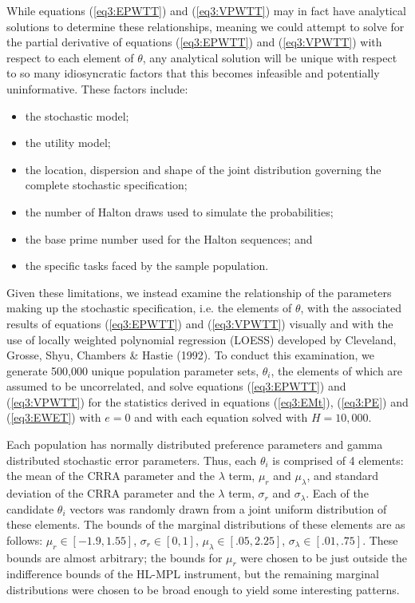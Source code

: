 \documentclass[../main.tex]{subfiles}
\begin{document}
While equations (\ref{eq3:EPWTT}) and (\ref{eq3:VPWTT}) may in fact have analytical solutions to determine these relationships, meaning we could attempt to solve for the partial derivative of equations (\ref{eq3:EPWTT}) and (\ref{eq3:VPWTT}) with respect to each element of $\theta$, any analytical solution will be unique with respect to so many idiosyncratic factors that this becomes infeasible and potentially uninformative.
These factors include:
\begin{itemize}
 \setlength\itemsep{-.25em}
	\item the stochastic model;
	\item the utility model;
	\item the location, dispersion and shape of the joint distribution governing the complete stochastic specification;
	\item the number of Halton draws used to simulate the probabilities;
	\item the base prime number used for the Halton sequences; and
	\item the specific tasks faced by the sample population.
\end{itemize}

\noindent Given these limitations, we instead examine the relationship of the parameters making up the stochastic specification, i.e. the elements of $\theta$, with the associated results of equations (\ref{eq3:EPWTT}) and (\ref{eq3:VPWTT}) visually and with the use of locally weighted polynomial regression (LOESS) developed by Cleveland, Grosse, Shyu, Chambers \& Hastie (1992).
To conduct this examination, we generate 500,000 unique population parameter sets, $\theta_i$, the elements of which are assumed to be uncorrelated, and solve equations (\ref{eq3:EPWTT}) and (\ref{eq3:VPWTT}) for the statistics derived in equations (\ref{eq3:EMt}), (\ref{eq3:PE}) and (\ref{eq3:EWET}) with $e=0$ and with each equation solved with $H=10,000$.

Each population has normally distributed preference parameters and gamma distributed stochastic error parameters.
Thus, each $\theta_i$ is comprised of 4 elements: the mean of the CRRA parameter and the $\lambda$ term, $\mu_r$ and $\mu_\lambda$, and standard deviation of the CRRA parameter and the $\lambda$ term, $\sigma_r$ and $\sigma_\lambda$. Each of the candidate $\theta_i$ vectors was randomly drawn from a joint uniform distribution of these elements.
The bounds of the marginal distributions of these elements are as follows: $\mu_r \in [-1.9 , 1.55 ]$, $\sigma_r \in [0 , 1]$, $\mu_\lambda \in [.05 , 2.25]$, $\sigma_\lambda \in [.01 , .75]$.
These bounds are almost arbitrary; the bounds for $\mu_r$ were chosen to be just outside the indifference bounds of the HL-MPL instrument, but the remaining marginal distributions were chosen to be broad enough to yield some interesting patterns.
\end{document}
